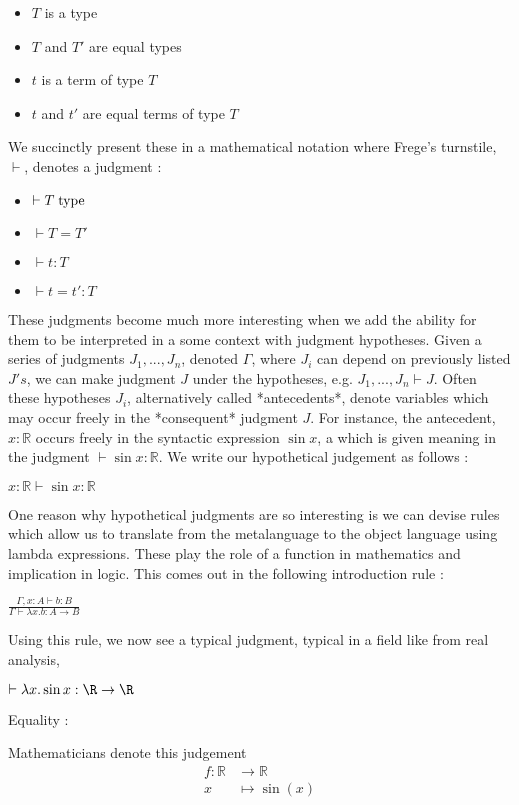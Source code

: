 \begin{itemize}[noitemsep]
\item $T$ is a type
\item $T$ and $T'$ are equal types
\item $t$ is a term of type $T$
\item $t$ and $t'$ are equal terms of type $T$
\end{itemize}


We succinctly present these in a mathematical notation where Frege's turnstile,
$\vdash$, denotes a judgment :

\begin{itemize}[noitemsep]
\item $\vdash T \; {\rm type}$
\item $\vdash T = T'$
\item $\vdash t:T$
\item $\vdash t = t':T$
\end{itemize}

These judgments become much more interesting when we add the ability for them to
be interpreted in a some context with judgment hypotheses. Given a series of
judgments $J_1,...,J_n$, denoted $\Gamma$, where $J_i$ can depend on previously
listed $J's$, we can make judgment $J$ under the hypotheses, e.g. $J_1,...,J_n
\vdash J$. Often these hypotheses $J_i$, alternatively called *antecedents*,
denote variables which may occur freely in the *consequent* judgment $J$. For
instance, the antecedent, $x : \mathbb{R}$ occurs freely in the syntactic
expression $\sin x$, a which is given meaning in the judgment $\vdash \sin x { :
} \mathbb{R}$. We write our hypothetical judgement as follows :

$x : \mathbb{R} \vdash \sin x : \mathbb{R}$

One reason why hypothetical judgments are so interesting is we can devise rules
which allow us to translate from the metalanguage to the object language using
lambda expressions. These play the role of a function in mathematics and
implication in logic. This comes out in the following introduction rule :

$ \frac{\Gamma, x : A \vdash b : B} {\Gamma \vdash \lambda x. b : A \rightarrow
B} $

Using this rule, we now see a typical judgment, typical in a field like from
real analysis,

$\vdash \lambda x. \sin x : \R \rightarrow \R$

Equality :

Mathematicians denote this judgement
\begin{align*} f {:} \mathbb{R} &\rightarrow \mathbb{R}\\ x &\mapsto \sin ( x )
\end{align*}


